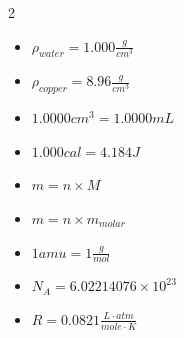\documentclass[11pt,addpoints]{exam}   	%
\begin{document}
\begin{multicols}{2}
\begin{itemize}
%
%

\item
$\rho_{water} = 1.000 \frac{g}{cm^3}$
\vspace{0.2in}

\item
$\rho_{copper} = 8.96 \frac{g}{cm^3}$
\vspace{0.2in}

\item
$ 1.0000 cm^3 = 1.0000 mL $
\vspace{0.2in}

\item
$ 1.000 cal = 4.184 J $
\vspace{0.2in}

\item
$m = n \times M$
\vspace{0.2in}

\item
$m = n \times m_{molar}$
\vspace{0.2in}

\item
$1 amu = 1 \frac{g}{mol}$ 
\vspace{0.2in}

\item
$N_A = 6.02214076 \times 10^{23} $ 
\vspace{0.2in}

\item 
$R = 0.0821 \frac{L \cdot atm}{mole \cdot K}$
\vspace{0.2in}

\end{itemize}
\vspace{0.2in}

\end{multicols}




\pagebreak
\end{document}
